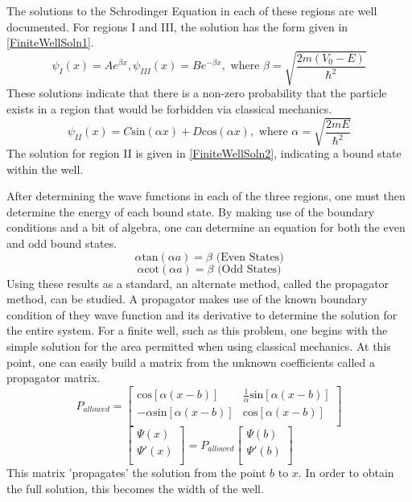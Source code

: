 \documentclass[12pt]{article}
\begin{document}
The solutions to the Schrodinger Equation in each of these regions are well documented.  For regions I and III, the solution has the form given in \eqref{FiniteWellSoln1}.
\begin{equation}
\label{FiniteWellSoln1}
\psi_I(x)=Ae^{\beta x} , \psi_{III}(x)=Be^{-\beta x} , \text{ where } \beta = \sqrt{\frac{2m(V_0-E)}{\hbar^2}}
\end{equation}
These solutions indicate that there is a non-zero probability that the particle exists in a region that would be forbidden via classical mechanics.  
\begin{equation}
\label{FiniteWellSoln2}
\psi_{II}(x)=C\text{sin}(\alpha x) + D\text{cos}(\alpha x) , \text{ where } \alpha = \sqrt{\frac{2mE}{\hbar^2}}
\end{equation}
The solution for region II is given in \eqref{FiniteWellSoln2}, indicating a bound state within the well.

After determining the wave functions in each of the three regions, one must then determine the energy of each bound state.  By making use of the boundary conditions and a bit of algebra, one can determine an equation for both the even and odd bound states.
\begin{equation}
\label{FiniteWellEven}
\alpha \text{tan}(\alpha a) = \beta \text{ (Even States)}
\end{equation}
\begin{equation}
\label{FiniteWellOdd}
\alpha \text{cot}(\alpha a) = \beta \text{ (Odd States)}
\end{equation}
Using these results as a standard, an alternate method, called the propagator method, can be studied.  A propagator makes use of the known boundary condition of they wave function and its derivative to determine the solution for the entire system.  For a finite well, such as this problem, one begins with the simple solution for the area permitted when using classical mechanics.  At this point, one can easily build a matrix from the unknown coefficients called a propagator matrix.
\[
P_{allowed} =
\left[ {\begin{array}{cc}
\text{cos}[\alpha(x-b)] & \frac{1}{\alpha}\text{sin}[\alpha(x-b)]  \\
 -\alpha \text{sin}[\alpha(x-b)] & \text{cos}[\alpha(x-b)]  \\
\end{array} } \right]
\]
\[
\left[ {\begin{array}{c}
\Psi(x)\\
\Psi'(x) \\
\end{array} } \right] = P_{allowed}
\left[ {\begin{array}{c}
\Psi(b) \\
\Psi'(b)\\
\end{array} } \right]
\]
This matrix 'propagates' the solution from the point $b$ to $x$.  In order to obtain the full solution, this becomes the width of the well.
\end{document}
